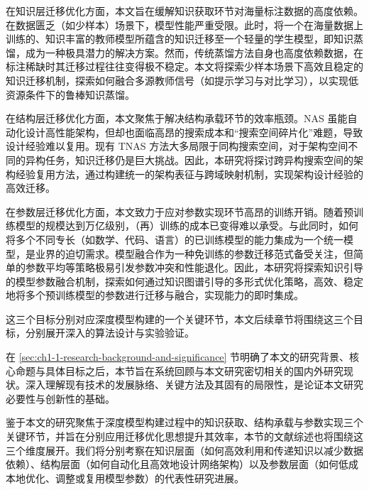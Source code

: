 \documentclass[../main.tex]{subfiles}
\begin{document}
在知识层迁移优化方面，本文旨在缓解知识获取环节对海量标注数据的高度依赖。在数据匮乏（如少样本）场景下，模型性能严重受限。此时，将一个在海量数据上训练的、知识丰富的教师模型所蕴含的知识迁移至一个轻量的学生模型，即知识蒸馏，成为一种极具潜力的解决方案\cite{distillingknowledgeneural_hinton_2015}。然而，传统蒸馏方法自身也高度依赖数据，在标注稀缺时其迁移过程往往变得极不稳定。本文将探索少样本场景下高效且稳定的知识迁移机制，探索如何融合多源教师信号（如提示学习\cite{exploitingclozequestions_schick_2021,ptuningv2_liu_2021}与对比学习\cite{representationlearningcontrastive_oord_2018}），以实现低资源条件下的鲁棒知识蒸馏。

在结构层迁移优化方面，本文聚焦于解决结构承载环节的效率瓶颈。NAS 虽能自动化设计高性能架构，但却也面临高昂的搜索成本和“搜索空间碎片化”难题，导致设计经验难以复用\cite{neuralarchitecturesearch_elsken_2019,nasbench101_ying_2019}。现有 TNAS 方法大多局限于同构搜索空间\cite{emtnastransferring_liao_2023,evolutionarymultitaskconvolutional_zhou_2024}，对于架构空间不同的异构任务，知识迁移仍是巨大挑战。因此，本研究将探讨跨异构搜索空间的架构经验复用方法，通过构建统一的架构表征与跨域映射机制，实现架构设计经验的高效迁移\cite{oncealltrain_cai_2020}。

在参数层迁移优化方面，本文致力于应对参数实现环节高昂的训练开销。随着预训练模型的规模达到万亿级别，（再）训练的成本已变得难以承受。与此同时，如何将多个不同专长（如数学、代码、语言）的已训练模型的能力集成为一个统一模型，是业界的迫切需求。模型融合作为一种免训练的参数迁移范式备受关注，但简单的参数平均等策略极易引发参数冲突和性能退化\cite{modelsoupsaveraging_wortsman_2022,gitrebasin_ainsworth_2023,mergingmodelsfisher_matena_2022}。因此，本研究将探索知识引导的模型参数融合机制，探索如何通过知识图谱引导的多形式优化策略，高效、稳定地将多个预训练模型的参数进行迁移与融合，实现能力的即时集成。



这三个目标分别对应深度模型构建的一个关键环节，本文后续章节将围绕这三个目标，分别展开深入的算法设计与实验验证。

\label{sec:ch1-2-global-research-status}

在 \ref{sec:ch1-1-research-background-and-significance} 节明确了本文的研究背景、核心命题与具体目标之后，本节旨在系统回顾与本文研究密切相关的国内外研究现状。深入理解现有技术的发展脉络、关键方法及其固有的局限性，是论证本文研究必要性与创新性的基础。

鉴于本文的研究聚焦于深度模型构建过程中的知识获取、结构承载与参数实现三个关键环节，并旨在分别应用迁移优化思想提升其效率，本节的文献综述也将围绕这三个维度展开。我们将分别考察在知识层面（如何高效利用和传递知识以减少数据依赖）、结构层面（如何自动化且高效地设计网络架构）以及参数层面（如何低成本地优化、调整或复用模型参数）的代表性研究进展。
\end{document}
